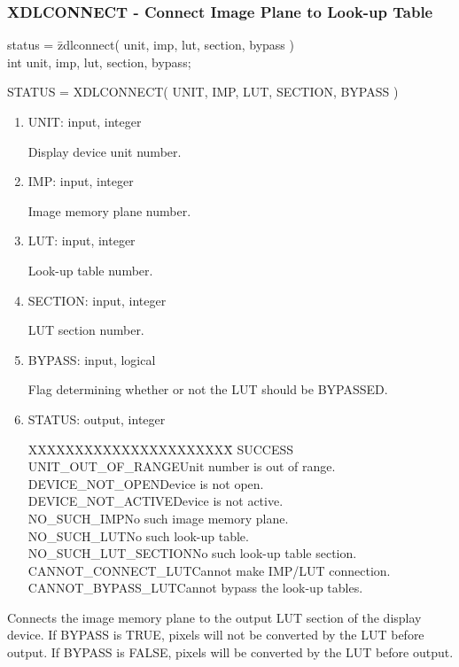 \subsubsection{XDLCONNECT - Connect Image Plane to Look-up Table}
\begin{tabbing}
status = \=zdlconnect( unit, imp, lut, section, bypass )\\
\>int  unit, imp, lut, section, bypass;\\
\end{tabbing}
STATUS = XDLCONNECT( UNIT, IMP, LUT, SECTION, BYPASS )
\begin{enumerate}
\item UNIT:  input, integer

Display device unit number.
\item IMP:  input, integer

Image memory plane number.
\item LUT:  input, integer

Look-up table number.
\item SECTION:  input, integer

LUT section number.
\item BYPASS:  input, logical

Flag determining whether or not the LUT should be BYPASSED.
\item STATUS:  output, integer
\begin{tabbing}
XXXXXXXXXXXXXXXXXXXXXX\=\kill
SUCCESS\\
UNIT\_OUT\_OF\_RANGE\>Unit number is out of range.\\
DEVICE\_NOT\_OPEN\>Device is not open.\\
DEVICE\_NOT\_ACTIVE\>Device is not active.\\
NO\_SUCH\_IMP\>No such image memory plane.\\
NO\_SUCH\_LUT\>No such look-up table.\\
NO\_SUCH\_LUT\_SECTION\>No such look-up table section.\\
CANNOT\_CONNECT\_LUT\>Cannot make IMP/LUT connection.\\
CANNOT\_BYPASS\_LUT\>Cannot bypass the look-up tables.\\
\end{tabbing}
\end{enumerate}
Connects the image memory plane to the output LUT section of the
display device.  If BYPASS is TRUE, pixels will not be converted by
the LUT before output.  If BYPASS is FALSE, pixels will be converted
by the LUT before output.
\newpage

